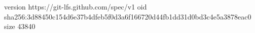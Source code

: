 version https://git-lfs.github.com/spec/v1
oid sha256:3d88450c154d6e37b4dfeb5f0d3a6f166720d44fb1dd31d0bd3c4e5a3878eac0
size 43840
